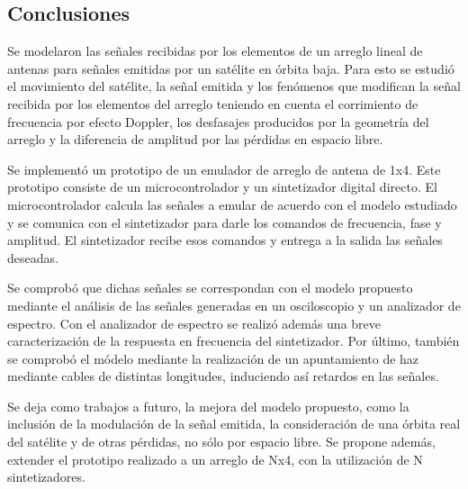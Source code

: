 \documentclass{article}
\newenvironment{standalone}{\begin{preview}}{\end{preview}}
\begin{document}
\begin{standalone}
  \section{Conclusiones}

  Se modelaron las señales recibidas por los elementos de un arreglo lineal de antenas para señales emitidas por un satélite en órbita baja.
  Para esto se estudió el movimiento del satélite, la señal emitida y los fenómenos que modifican la señal recibida por los elementos del arreglo teniendo en cuenta el corrimiento de frecuencia por efecto Doppler, los desfasajes producidos por la geometría del arreglo y la diferencia de amplitud por las pérdidas en espacio libre.

  Se implementó un prototipo de un emulador de arreglo de antena de 1x4.
  Este prototipo consiste de un microcontrolador y un sintetizador digital directo.
  El microcontrolador calcula las señales a emular de acuerdo con el modelo estudiado y se comunica con el sintetizador para darle los comandos de frecuencia, fase y amplitud.
  El sintetizador recibe esos comandos y entrega a la salida las señales deseadas.

  Se comprobó que dichas señales se correspondan con el modelo propuesto mediante el análisis de las señales generadas en un osciloscopio y un analizador de espectro.
  Con el analizador de espectro se realizó además una breve caracterización de la respuesta en frecuencia del sintetizador.
  Por último, también se comprobó el módelo mediante la realización de un apuntamiento de haz mediante cables de distintas longitudes, induciendo así retardos en las señales.

  Se deja como trabajos a futuro, la mejora del modelo propuesto, como la inclusión de la modulación de la señal emitida, la consideración de una órbita real del satélite y de otras pérdidas, no sólo por espacio libre.
  Se propone además, extender el prototipo realizado a un arreglo de Nx4, con la utilización de N sintetizadores.

\end{standalone}
\end{document}
